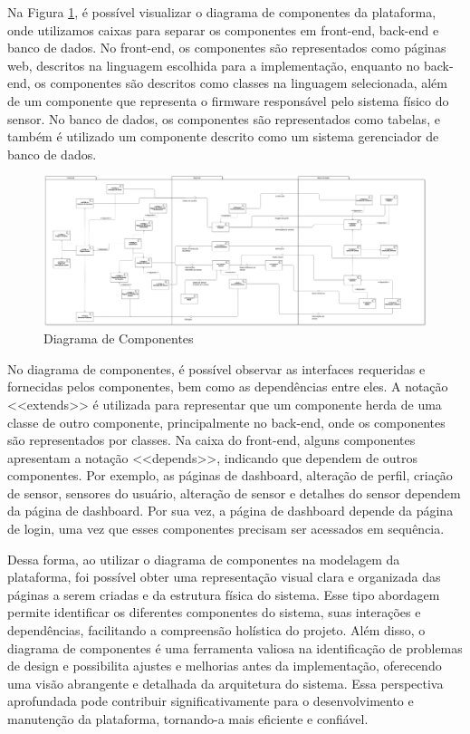 \documentclass[tcc,capa]{texufpel}
\begin{document}
Na Figura \ref{diagramacomponentes}, é possível visualizar o diagrama de componentes da plataforma, onde utilizamos caixas para separar os componentes em front-end, back-end e banco de dados. No front-end, os componentes são representados como páginas web, descritos na linguagem escolhida para a implementação, enquanto no back-end, os componentes são descritos como classes na linguagem selecionada, além de um componente que representa o firmware responsável pelo sistema físico do sensor. No banco de dados, os componentes são representados como tabelas, e também é utilizado um componente descrito como um sistema gerenciador de banco de dados.
\begin{figure}[htbp]
  \centering \includegraphics[scale=.165]{assets/componentes.png}
  \caption{Diagrama de Componentes}
  \label{diagramacomponentes}
\end{figure}
\newpage

No diagrama de componentes, é possível observar as interfaces requeridas e fornecidas pelos componentes, bem como as dependências entre eles. A notação <<extends>> é utilizada para representar que um componente herda de uma classe de outro componente, principalmente no back-end, onde os componentes são representados por classes. Na caixa do front-end, alguns componentes apresentam a notação <<depends>>, indicando que dependem de outros componentes. Por exemplo, as páginas de dashboard, alteração de perfil, criação de sensor, sensores do usuário, alteração de sensor e detalhes do sensor dependem da página de dashboard. Por sua vez, a página de dashboard depende da página de login, uma vez que esses componentes precisam ser acessados em sequência.

Dessa forma, ao utilizar o diagrama de componentes na modelagem da plataforma, foi possível obter uma representação visual clara e organizada das páginas a serem criadas e da estrutura física do sistema. Esse tipo abordagem permite identificar os diferentes componentes do sistema, suas interações e dependências, facilitando a compreensão holística do projeto. Além disso, o diagrama de componentes é uma ferramenta valiosa na identificação de problemas de design e possibilita ajustes e melhorias antes da implementação, oferecendo uma visão abrangente e detalhada da arquitetura do sistema. Essa perspectiva aprofundada pode contribuir significativamente para o desenvolvimento e manutenção da plataforma, tornando-a mais eficiente e confiável.
\end{document}
